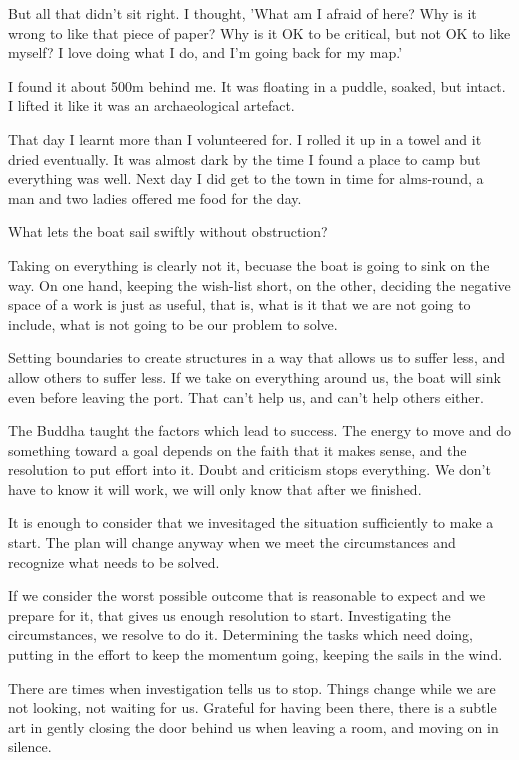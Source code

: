 But all that didn't sit right. I thought, 'What am I afraid of here? Why
is it wrong to like that piece of paper? Why is it OK to be critical,
but not OK to like myself? I love doing what I do, and I'm going back
for my map.'

I found it about 500m behind me. It was floating in a puddle, soaked,
but intact. I lifted it like it was an archaeological artefact.

That day I learnt more than I volunteered for. I rolled it up in a towel
and it dried eventually. It was almost dark by the time I found a place
to camp but everything was well. Next day I did get to the town in time
for alms-round, a man and two ladies offered me food for the day.

What lets the boat sail swiftly without obstruction?

Taking on everything is clearly not it, becuase the boat is going to
sink on the way. On one hand, keeping the wish-list short, on the other,
deciding the negative space of a work is just as useful, that is, what
is it that we are not going to include, what is not going to be our
problem to solve.

Setting boundaries to create structures in a way that allows us to
suffer less, and allow others to suffer less. If we take on everything
around us, the boat will sink even before leaving the port. That can't
help us, and can't help others either.

The Buddha taught the factors which lead to success. The energy to move
and do something toward a goal depends on the faith that it makes sense,
and the resolution to put effort into it. Doubt and criticism stops
everything. We don't have to know it will work, we will only know that
after we finished.

It is enough to consider that we invesitaged the situation sufficiently
to make a start. The plan will change anyway when we meet the
circumstances and recognize what needs to be solved.

If we consider the worst possible outcome that is reasonable to expect
and we prepare for it, that gives us enough resolution to start.
Investigating the circumstances, we resolve to do it. Determining the
tasks which need doing, putting in the effort to keep the momentum
going, keeping the sails in the wind.

There are times when investigation tells us to stop. Things change while
we are not looking, not waiting for us. Grateful for having been there,
there is a subtle art in gently closing the door behind us when leaving
a room, and moving on in silence.
